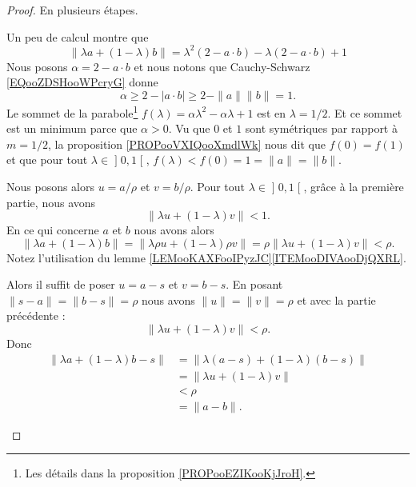 \begin{proof}
	En plusieurs étapes.
	\begin{subproof}
		\spitem[Si \( s=0\) et \( \| a \|=\| b \|=1\)]
		Un peu de calcul montre que
		\begin{equation}
			\| \lambda a+(1-\lambda)b \|=\lambda^2(2-a\cdot b)-\lambda(2-a\cdot b)+1
		\end{equation}
		Nous posons \( \alpha=2-a\cdot b\) et nous notons que Cauchy-Schwarz \eqref{EQooZDSHooWPcryG} donne
		\begin{equation}
			\alpha\geq 2-| a\cdot b |\geq 2-\| a \|\| b \|=1.
		\end{equation}
		Le sommet de la parabole\footnote{Les détails dans la proposition \ref{PROPooEZIKooKjJroH}.} \( f(\lambda)=\alpha\lambda ^2-\alpha \lambda +1\) est en \( \lambda=1/2\). Et ce sommet est un minimum parce que \( \alpha>0\). Vu que \( 0\) et \( 1\) sont symétriques par rapport à \( m=1/2\), la proposition \ref{PROPooVXIQooXmdlWk} nous dit que \( f(0)=f(1)\) et que pour tout \( \lambda\in\mathopen] 0,1\mathclose[\), \( f(\lambda)<f(0)=1=\| a \|=\| b \|\).

			\spitem[Si \( \| a \|=\| b \|=\rho\)]
			Nous posons alors \( u=a/\rho\) et \( v=b/\rho\). Pour tout \( \lambda\in\mathopen] 0,1\mathclose[\), grâce à la première partie, nous avons
		\begin{equation}
			\| \lambda u+(1-\lambda)v \|<1.
		\end{equation}
		En ce qui concerne \( a \) et \( b\) nous avons alors
		\begin{equation}
			\| \lambda a+(1-\lambda)b \|=\| \lambda\rho u+(1-\lambda)\rho v \|=\rho\| \lambda u+(1-\lambda)v \|<\rho.
		\end{equation}
		Notez l'utilisation du lemme \ref{LEMooKAXFooIPyzJC}\ref{ITEMooDIVAooDjQXRL}.

		\spitem[Si \( s\neq 0\)]
		Alors il suffit de poser \( u=a-s\) et \( v=b-s\). En posant \( \| s-a \|=\| b-s \|=\rho\) nous avons \( \| u \|=\| v \|=\rho\) et avec la partie précédente :
		\begin{equation}
			\| \lambda u+(1-\lambda)v \|<\rho.
		\end{equation}
		Donc
		\begin{subequations}
			\begin{align}
				\| \lambda a+(1-\lambda)b-s \| & =\| \lambda(a-s)+(1-\lambda)(b-s) \| \\
				                               & =\| \lambda u+(1-\lambda)v \|        \\
				                               & <\rho                                \\
				                               & =\| a-b \|.
			\end{align}
		\end{subequations}
	\end{subproof}
\end{proof}



